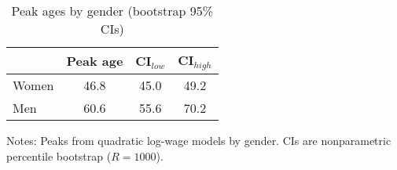 \begin{table}[!htbp]
\centering
\caption{Peak ages by gender (bootstrap 95\% CIs)}\label{tab:peakages}
\begin{tabular}{lccc}
\toprule
 & Peak age & CI$_{low}$ & CI$_{high}$ \\
\midrule
Women & 46.8 & 45.0 & 49.2 \\
Men & 60.6 & 55.6 & 70.2 \\
\bottomrule
\end{tabular}
\begin{flushleft}\footnotesize
Notes: Peaks from quadratic log-wage models by gender. CIs are nonparametric percentile bootstrap ($R=1000$).
\end{flushleft}
\end{table}
